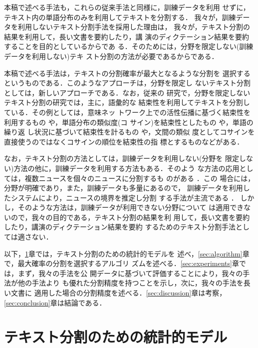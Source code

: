 本稿で述べる手法も，これらの従来手法と同様に，訓練データを利用
せずに，テキスト内の単語分布のみを利用してテキストを分割する．
我々が，訓練データを利用しないテキスト分割手法を採用した理由は，
我々が，テキスト分割の結果を利用して，長い文書を要約したり，講
演のディクテーション結果を要約することを目的としているからであ
る．そのためには，分野を限定しない(訓練データを利用しない)テキ
スト分割の方法が必要であるからである．

本稿で述べる手法は，テキストの分割確率が最大となるような分割を
選択するというものである．このようなアプローチは，分野を限定し
ないテキスト分割としては，新しいアプローチである．なお，従来の
研究で，分野を限定しないテキスト分割の研究では，主に，語彙的な
結束性を利用してテキストを分割している．その例としては，意味ネッ
トワーク上での活性伝播に基づく結束性を利用するもの
\cite{kozima93:_text_segmen_simil_words}や，単語分布の類似度(コ
サイン)を結束性としたもの
\cite{hearst94:_multi_parag_segmen_expos_text}や，単語の繰り返
し状況に基づいて結束性を計るもの
\cite{reynar94:_autom_method_findin_topic_bound}や，文間の類似
度としてコサインを直接使うのではなくコサインの順位を結束性の指
標とするもの\cite{choi00:_advan}などがある．

なお，テキスト分割の方法としては，訓練データを利用しない(分野を
限定しない)方法の他に，訓練データを利用する方法もある．そのよう
な方法の応用としては，複数ニュースを個々のニュースに分割するも
のがある
\cite{allan98:_topic_detec_track_pilot_study_final_repor}．この
場合には，分野が明確であり，また，訓練データも多量にあるので，
訓練データを利用したシステムにより，ニュースの境界を推定し分割
する手法が主流である
\cite[など]{mulbregt98:_hidden_markov_model_approac_text,beeferman99:_statis_model_text_segmen}．
しかし，そのような方法は，訓練データが利用できない分野について
は適用できないので，我々の目的である，テキスト分割の結果を利
用して，長い文書を要約したり，講演のディクテーション結果を要約
するためのテキスト分割手法としては適さない．

以下，\ref{sec:model}章では，テキスト分割のための統計的モデルを
述べ，\ref{sec:algorithm}章で，最大確率の分割を選択するアルゴリ
ズムを述べる．\ref{sec:experiments}章では，まず，我々の手法を公
開データに基づいて評価することにより，我々の手法が他の手法より
も優れた分割精度を持つことを示し，次に，我々の手法を長い文書に
適用した場合の分割精度を述べる．\ref{sec:discussion}章は考察，
\ref{sec:conclusion}章は結論である．

\section{テキスト分割のための統計的モデル}
\label{sec:model}

